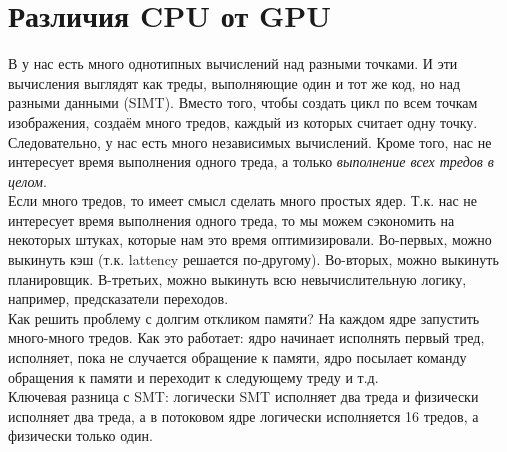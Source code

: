 \documentclass[12pt, a4paper]{article}
\begin{document}
\section{Различия CPU от GPU}
В у нас есть много однотипных вычислений над разными точками. И эти вычисления выглядят как треды, выполняющие один и тот же код, но над разными данными (SIMT). Вместо того, чтобы создать цикл по всем точкам изображения, создаём много тредов, каждый из которых считает одну точку.\\
Следовательно, у нас есть много независимых вычислений. Кроме того, нас не интересует время выполнения одного треда, а только \textit{выполнение всех тредов в целом}.\\
Если много тредов, то имеет смысл сделать много простых ядер. Т.к. нас не интересует время выполнения одного треда, то мы можем сэкономить на некоторых штуках, которые нам это время оптимизировали. Во-первых, можно выкинуть кэш (т.к. lattency решается по-другому). Во-вторых, можно выкинуть планировщик. В-третьих, можно выкинуть всю невычислительную логику, например, предсказатели переходов.\\
Как решить проблему с долгим откликом памяти? На каждом ядре запустить много-много тредов. Как это работает: ядро начинает исполнять первый тред, исполняет, пока не случается обращение к памяти, ядро посылает команду обращения к памяти и переходит к следующему треду и т.д.\\
Ключевая разница с SMT: логически SMT исполняет два треда и физически исполняет два треда, а в потоковом ядре логически исполняется 16 тредов, а физически только один.
\end{document}
